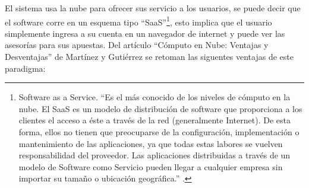 El sistema usa la nube para ofrecer sus servicio a los usuarios, se puede decir que el software corre en un esquema tipo ``SaaS''\footnote{Software as a Service. ``Es el más conocido de los niveles de cómputo en la nube. El SaaS es un modelo de distribución de software que proporciona a los clientes el acceso a éste a través de la red (generalmente Internet). De esta forma, ellos no tienen que preocuparse de la configuración, implementación o mantenimiento de las aplicaciones, ya que todas estas labores se vuelven responsabilidad del proveedor. Las aplicaciones distribuidas a través de un modelo de Software como Servicio pueden llegar a cualquier empresa sin importar su tamaño o ubicación geográfica.'' \cite{computoNube}.}, esto implica que el usuario simplemente ingresa a su cuenta en un navegador de internet y puede ver las asesorías para sus apuestas.  
Del artículo ``Cómputo en Nube: Ventajas y Desventajas'' de Martínez y Gutiérrez \cite{computoNube}  se retoman las siguentes ventajas de este paradigma:
